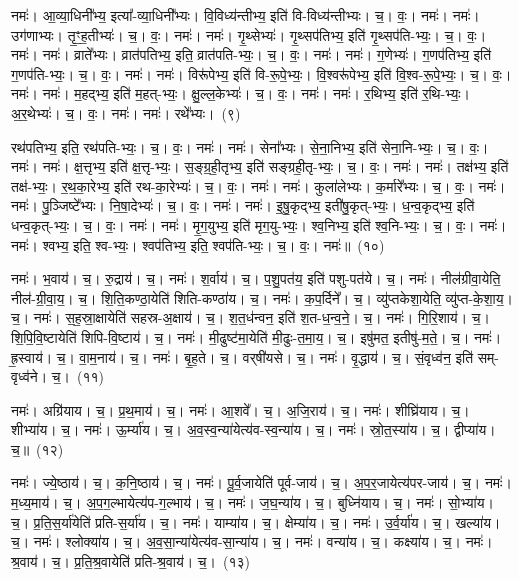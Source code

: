 नमः॑। आ॒व्या॒धिनी᳚भ्य॒ इत्या᳚-व्या॒धिनी᳚भ्यः। वि॒विध्य॑न्तीभ्य॒ इति॑ वि-विध्य॑न्तीभ्यः। च॒। वः॒। नमः॑। नमः॑। उग॑णाभ्यः। तृ॒ꣳ॒ह॒तीभ्यः॑। च॒। वः॒। नमः॑। 
नमः॑। गृ॒थ्सेभ्यः॑। गृ॒थ्सप॑तिभ्य॒ इति॑ गृ॒थ्सप॑ति-भ्यः॒। च॒। वः॒। नमः॑। 
नमः॑। व्राते᳚भ्यः। व्रात॑पतिभ्य॒ इति॒ व्रात॑पति-भ्यः॒। च॒। वः॒। नमः॑। 
नमः॑। ग॒णेभ्यः॑। ग॒णप॑तिभ्य॒ इति॑ ग॒णप॑ति-भ्यः॒। च॒। वः॒। नमः॑। 
नमः॑। विरू॑पेभ्य॒ इति॑ वि-रू॒पे॒भ्यः॒। वि॒श्वरू॑पेभ्य॒ इति॑ वि॒श्व-रू॒पे॒भ्यः॒। च॒। वः॒। नमः॑। 
नमः॑। म॒हद्भ्य॒ इति॑ म॒हत्-भ्यः॒। क्षु॒ल्ल॒केभ्यः॑। च॒। वः॒। नमः॑। 
नमः॑। र॒थिभ्य॒ इति॑ र॒थि-भ्यः॒। अ॒र॒थेभ्यः॑। च॒। वः॒। नमः॑। 
नमः॑। रथे᳚भ्यः।~(९)


रथ॑पतिभ्य॒ इति॒ रथ॑पति-भ्यः॒। च॒। वः॒। नमः॑। 
नमः॑। सेना᳚भ्यः। से॒ना॒निभ्य॒ इति॑ सेना॒नि-भ्यः॒। च॒। वः॒। नमः॑। 
नमः॑। क्ष॒त्तृभ्य॒ इति॑ क्ष॒त्तृ-भ्यः॒। स॒ङ्ग्र॒ही॒तृभ्य॒ इति॑ सङ्ग्रही॒तृ-भ्यः॒। च॒। वः॒। नमः॑। 
नमः॑। तक्ष॑भ्य॒ इति॑ तक्ष॑-भ्यः॒। र॒थ॒का॒रेभ्य॒ इति॑ रथ-का॒रेभ्यः॑। च॒। वः॒। नमः॑। 
नमः॑। कुला॑लेभ्यः। क॒र्मारे᳚भ्यः। च॒। वः॒। नमः॑। 
नमः॑। पु॒ञ्जिष्टे᳚भ्यः। नि॒षा॒देभ्यः॑। च॒। वः॒। नमः॑। 
नमः॑। इ॒षु॒कृद्भ्य॒ इती॑षु॒कृत्-भ्यः॒। ध॒न्व॒कृद्भ्य॒ इति॑ धन्व॒कृत्-भ्यः॒। च॒। वः॒। नमः॑। 
नमः॑। मृ॒ग॒युभ्य॒ इति॑ मृग॒यु-भ्यः॒। श्व॒निभ्य॒ इति॑ श्व॒नि-भ्यः॒। च॒। वः॒। नमः॑। 
नमः॑। श्वभ्य॒ इति॒ श्व-भ्यः॒। श्वप॑तिभ्य॒ इति॒ श्वप॑ति-भ्यः॒। च॒। वः॒। नमः॑॥~(१०)


नमः॑। भ॒वाय॑। च॒। रु॒द्राय॑। च॒। 
नमः॑। श॒र्वाय॑। च॒। प॒शु॒पत॑य॒ इति॑ पशु-पत॑ये। च॒। 
नमः॑। नील॑ग्रीवा॒येति॒ नील॑-ग्री॒वा॒य॒। च॒। शि॒ति॒कण्ठा॒येति॑ शिति-कण्ठा॑य। च॒। 
नमः॑। क॒प॒र्दिने᳚। च॒। व्यु॑प्तकेशा॒येति॒ व्यु॑प्त-के॒शा॒य॒। च॒। 
नमः॑। स॒ह॒स्रा॒क्षायेति॑ सहस्र-अ॒क्षाय॑। च॒। श॒त॒ध॑न्वन॒ इति॑ श॒त-ध॒न्व॒ने॒। च॒। 
नमः॑। गि॒रि॒शाय॑। च॒। शि॒पि॒वि॒ष्टायेति॑ शिपि-वि॒ष्टाय॑। च॒। 
नमः॑। मी॒ढुष्ट॑मा॒येति॑ मी॒ढुः-त॒मा॒य॒। च॒। इषु॑मत॒ इतीषु॑-म॒ते॒। च॒। 
नमः॑। ह्र॒स्वाय॑। च॒। वा॒म॒नाय॑। च॒। 
नमः॑। बृ॒ह॒ते। च॒। वर्‌षी॑यसे। च॒। 
नमः॑। वृ॒द्धाय॑। च॒। सं॒वृध्व॑न॒ इति॑ सम्-वृध्व॑ने। च॒।~(११)


नमः॑। अग्रि॑याय। च॒। प्र॒थ॒माय॑। च॒। 
नमः॑। आ॒शवे᳚। च॒। अ॒जि॒राय॑। च॒। 
नमः॑। शीघ्रि॑याय। च॒। शीभ्या॑य। च॒। 
नमः॑। ऊ॒र्म्या॑य। च॒। अ॒व॒स्व॒न्या॑येत्य॑व-स्व॒न्या॑य। च॒। 
नमः॑। स्रो॒त॒स्या॑य। च॒। द्वीप्या॑य। च॒॥~(१२)


नमः॑। ज्ये॒ष्ठाय॑। च॒। क॒नि॒ष्ठाय॑। च॒। 
नमः॑। पू॒र्व॒जायेति॑ पूर्व-जाय॑। च॒। अ॒प॒र॒जायेत्य॑पर-जाय॑। च॒। 
नमः॑। म॒ध्य॒माय॑। च॒। अ॒प॒ग॒ल्भायेत्य॑प-ग॒ल्भाय॑। च॒। 
नमः॑। ज॒घ॒न्या॑य। च॒। बुध्नि॑याय। च॒। 
नमः॑। सो॒भ्या॑य। च॒। प्र॒ति॒स॒र्या॑येति॑ प्रति-स॒र्या॑य। च॒। 
नमः॑। याम्या॑य। च॒। क्षेम्या॑य। च॒। 
नमः॑। उ॒र्व॒र्या॑य। च॒। खल्या॑य। च॒। 
नमः॑। श्लोक्या॑य। च॒। अ॒व॒सा॒न्या॑येत्य॑व-सा॒न्या॑य। च॒। 
नमः॑। वन्या॑य। च॒। कक्ष्या॑य। च॒। 
नमः॑। श्र॒वाय॑। च॒। प्र॒ति॒श्र॒वायेति॑ प्रति-श्र॒वाय॑। च॒।~(१३)


